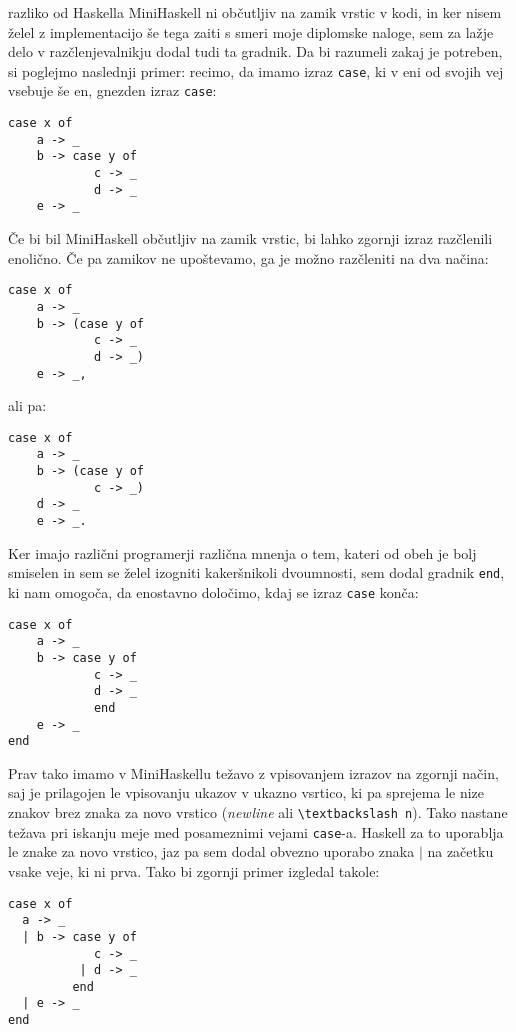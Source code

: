\documentclass[12pt,a4paper,openany]{book}
\begin{document}
razliko od Haskella MiniHaskell ni občutljiv na zamik vrstic v kodi, in ker nisem želel z implementacijo še tega zaiti s smeri moje diplomske naloge, sem za lažje delo v razčlenjevalnikju 
dodal tudi ta gradnik. Da bi razumeli zakaj je potreben, si poglejmo naslednji primer: recimo, da imamo izraz \lstinline{case}, ki v eni od svojih vej vsebuje še en, gnezden izraz \lstinline{case}:
\begin{lstlisting}
case x of 
    a -> _
    b -> case y of
            c -> _
            d -> _
    e -> _
\end{lstlisting}
Če bi bil MiniHaskell občutljiv na zamik vrstic, bi lahko zgornji izraz razčlenili enolično. Če pa zamikov ne upoštevamo, ga je možno razčleniti na dva načina:
\begin{lstlisting}
case x of 
    a -> _
    b -> (case y of
            c -> _
            d -> _)
    e -> _,
\end{lstlisting}
ali pa:
\begin{lstlisting}
case x of 
    a -> _
    b -> (case y of
            c -> _)
    d -> _
    e -> _.
\end{lstlisting}
Ker imajo različni programerji različna mnenja o tem, kateri od obeh je bolj smiselen in sem se želel izogniti kakeršnikoli dvoumnosti, sem dodal 
gradnik \lstinline{end}, ki nam omogoča, da enostavno določimo, kdaj se izraz \lstinline{case} konča:
\begin{lstlisting}
case x of 
    a -> _
    b -> case y of
            c -> _
            d -> _
            end
    e -> _
end
\end{lstlisting}
Prav tako imamo v MiniHaskellu težavo z vpisovanjem izrazov na zgornji način, saj je prilagojen le vpisovanju ukazov v ukazno vsrtico, ki pa 
sprejema le nize znakov brez znaka za novo vrstico (\emph{newline} ali \lstinline{\textbackslash n}). Tako nastane težava pri iskanju meje med posameznimi vejami
\lstinline{case}-a. Haskell za to uporablja le znake za novo vrstico, jaz pa sem dodal obvezno uporabo znaka $\mid$ na začetku vsake veje, ki ni prva.
Tako bi zgornji primer izgledal takole:
\begin{lstlisting}
case x of 
  a -> _
  | b -> case y of
            c -> _
          | d -> _
         end
  | e -> _
end
\end{lstlisting}
\end{document}
